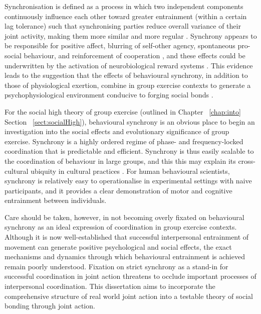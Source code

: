 \begin{CJK}{UTF8}{gbsn}
Synchronisation is defined as a process in which two independent components continuously influence each other toward greater entrainment (within a certain lag tolerance) such that synchronising parties reduce overall variance of their joint activity, making them more similar and more regular \citep{Pikovsky2007}.  Synchrony appears to be responsible for positive affect, blurring of self-other agency, spontaneous pro-social behaviour, and reinforcement of cooperation \citep{Mogan2017}, and these effects could be underwritten by the activation of neurobiological reward systems \citep{Tarr2016}.  This evidence leads to the suggestion that the effects of behavioural synchrony, in addition to those of physiological exertion, combine in group exercise contexts to generate a psychophysiological environment conducive to forging social bonds \citep{Cohen2017}.

For the social high theory of group exercise (outlined in Chapter ~\ref{chap:into} Section ~\ref{sect:socialHigh}), behavioural synchrony is an obvious place to begin an investigation into the social effects and evolutionary significance of group exercise.  Synchrony is a highly ordered regime of phase- and frequency-locked coordination that is predictable and efficient. Synchrony is thus easily scalable to the coordination of behaviour in large groups, and this this may explain its cross-cultural ubiquity in cultural practices \citep{Dunbar2010,Tarr2016}.  For human behavioural scientists, synchrony is relatively easy to operationalise in experimental settings with naive participants, and it provides a clear demonstration of motor and cognitive entrainment between individuals.

Care should be taken, however, in not becoming overly fixated on behavioural synchrony as an ideal expression of coordination in group exercise contexts.  Although it is now well-established that successful interpersonal entrainment of movement can generate positive psychological and social effects, the exact mechanisms and dynamics through which behavioural entrainment is achieved remain poorly understood.  Fixation on strict synchrony as a stand-in for successful coordination in joint action threatens to occlude important processes of interpersonal coordination.  This dissertation aims to incorporate the comprehensive structure of real world joint action into a testable theory of social bonding through joint action.


\end{CJK}
